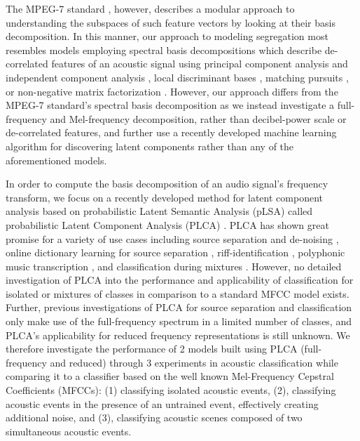 \documentclass[a4paper,10pt,final]{ThesisStyle}
\begin{document}
The MPEG-7 standard \cite{Casey2001a,Manjunath2002}, however, describes a modular approach to understanding the subspaces of such feature vectors by looking at their basis decomposition.  In this manner, our approach to modeling segregation most resembles models employing spectral basis decompositions which describe de-correlated features of an acoustic signal using principal component analysis and independent component analysis \cite{Casey2001a,Xiong2003,Kim2004}, local discriminant bases \cite{Su2011}, matching pursuits \cite{Chu2009a}, or non-negative matrix factorization \cite{Raj2010}.  However, our approach differs from the MPEG-7 standard's spectral basis decomposition \cite{Casey2001a} as we instead investigate a full-frequency and Mel-frequency decomposition, rather than decibel-power scale or de-correlated features, and further use a recently developed machine learning algorithm for discovering latent components rather than any of the aforementioned models.

In order to compute the basis decomposition of an audio signal's frequency transform, we focus on a recently developed method for latent component analysis based on probabilistic Latent Semantic Analysis (pLSA) \cite{Hofmann1999} called probabilistic Latent Component Analysis (PLCA) \cite{SmaragdisRajShashanka}.   PLCA has shown great promise for a variety of use cases including source separation and de-noising \cite{Smaragdis2007a,Smaragdis2007}, online dictionary learning for source separation \cite{Duan2012}, riff-identification \cite{Weiss2011}, polyphonic music transcription \cite{Benetos2011}, and classification during mixtures \cite{Nam2012}.  However, no detailed investigation of PLCA into the performance and applicability of classification for isolated or mixtures of classes in comparison to a standard MFCC model exists.  Further, previous investigations of PLCA for source separation and classification only make use of the full-frequency spectrum in a limited number of classes, and PLCA's applicability for reduced frequency representations is still unknown.  We therefore investigate the performance of 2 models built using PLCA (full-frequency and reduced) through 3 experiments in acoustic classification while comparing it to a classifier based on the well known Mel-Frequency Cepstral Coefficients (MFCCs): (1) classifying isolated acoustic events, (2), classifying acoustic events in the presence of an untrained event, effectively creating additional noise, and (3), classifying acoustic scenes composed of two simultaneous acoustic events.  
\end{document}
